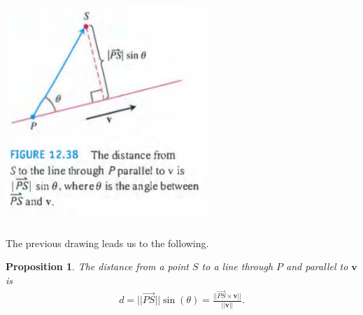 \documentclass[12pt, letter]{article}
\theoremstyle{plain}
\newtheorem{proposition}[theorem]{Proposition}
\numberwithin{theorem}{section}
\theoremstyle{definition}
\begin{document}
\begin{center}
\includegraphics[scale=0.7]{m1_f18}
\end{center}

\bigskip

The previous drawing leads us to the following.

\begin{proposition}
The distance from a point $S$ to a line through $P$ and parallel to $\bm{v}$ is
\begin{align*}
d = ||\vec{PS}||\sin(\theta) = \frac{||\vec{PS}\times\bm{v}||}{||\bm{v}||}.
\end{align*}
\end{proposition}

\bigskip

\hrulefill

\bigskip
\end{document}
